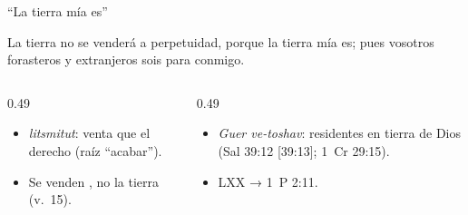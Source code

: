 \begin{frame}{``La tierra mía es''}
\begin{center}\end{center}
\begin{cita}La tierra no se venderá a perpetuidad, porque la tierra mía es; pues vosotros forasteros y extranjeros sois para conmigo.\end{cita}
\begin{columns}[t,onlytextwidth]
\begin{column}{0.49\textwidth}\small
\begin{itemize}
\item {} \emph{litsmitut}: venta que  el derecho (raíz ``acabar'').
\item Se venden , no la tierra (v.~15).
\end{itemize}
\end{column}
\begin{column}{0.49\textwidth}\small
\begin{itemize}
\item \emph{Guer ve-toshav}: residentes en tierra de Dios (Sal 39:12 [39:13]; 1~Cr 29:15).
\item LXX  → 1~P 2:11.
\end{itemize}
\end{column}
\end{columns}
\end{frame}

